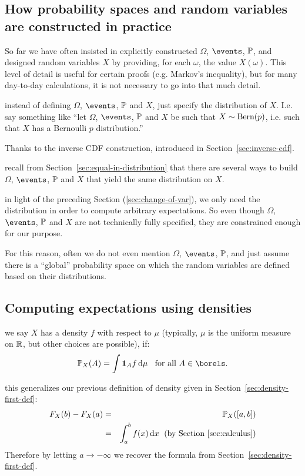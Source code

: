 \documentclass{article}
\begin{document}
\subsection{How probability spaces and random variables are constructed in practice}\label{sec:using-rv-to-construct-prs}

So far we have often insisted in explicitly constructed $\Omega$, $\events$, $\P$, and designed random variables $X$ by providing, for each $\omega$, the value $X(\omega)$. This level of detail is useful for certain proofs (e.g. Markov's inequality), but for many day-to-day calculations, it is not necessary to go into that much detail. 

 instead of defining $\Omega$, $\events$, $\P$ and $X$, just specify the distribution of $X$. I.e. say something like ``let $\Omega$, $\events$, $\P$ and $X$ be such that $X \sim \Bern(p)$, i.e. such that $X$ has a Bernoulli $p$ distribution.'' 

 Thanks to the inverse CDF construction, introduced in Section~\ref{sec:inverse-cdf}. 

 recall from Section~\ref{sec:equal-in-distribution} that there are several ways to build $\Omega$, $\events$, $\P$ and $X$ that yield the same distribution on $X$.

 in light of the preceding Section (\ref{sec:change-of-var}), we only need the distribution in order to compute arbitrary expectations. So even though $\Omega$, $\events$, $\P$ and $X$ are not technically fully specified, they are constrained enough for our purpose.

For this reason, often we do not even mention $\Omega$, $\events$, $\P$, and just assume there is a ``global'' probability space on which the random variables are defined based on their distributions. 


\subsection{Computing expectations using densities}

 we say $X$ has a density $f$ with respect to $\mu$ (typically, $\mu$ is the uniform measure on $\R$, but other choices are possible), if:
\[ \P_X(A) = \int \1_A f \ud \mu \;\;\text{ for all }A\in\borels. \]

 this generalizes our previous definition of density given in Section~\ref{sec:density-first-def}:
\begin{eqnarray*} 
F_X(b) - F_X(a) &=& \P_X([a, b]) \\
&=& \int_a^b f(x) \ud x \;\text{ (by Section~\ref{sec:calculus})}
\end{eqnarray*}
Therefore by letting $a \to -\infty$ we recover the formula from Section~\ref{sec:density-first-def}.
\end{document}
